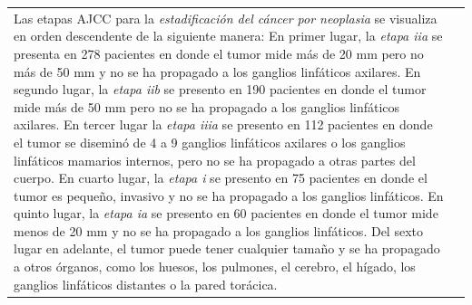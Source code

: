 \begin{table}[!htb]
	\footnotesize
	\begin{threeparttable}
		\begin{tabular}{p{8cm} p{7cm}} \toprule	 
			Las etapas AJCC para la \textit{estadificación del cáncer por neoplasia} se visualiza en orden descendente de la siguiente manera: En primer lugar, la \textit{etapa iia} se presenta en 278 pacientes en donde el tumor mide más de 20 mm pero no más de 50 mm y no se ha propagado a los ganglios linfáticos axilares. En segundo lugar, la \textit{etapa iib} se presento en 190 pacientes en donde el tumor mide más de 50 mm pero no se ha propagado a los ganglios linfáticos axilares. En tercer lugar la \textit{etapa iiia} se presento en 112 pacientes en donde el tumor se diseminó de 4 a 9 ganglios linfáticos axilares o los ganglios linfáticos mamarios internos, pero no se ha propagado a otras partes del cuerpo. En cuarto lugar, la \textit{etapa i} se presento en 75 pacientes  en donde el tumor es pequeño, invasivo y no se ha propagado a los ganglios linfáticos. En quinto lugar, la \textit{etapa ia} se presento en 60 pacientes en donde el tumor mide menos de 20 mm  y no se ha propagado a los ganglios linfáticos. Del sexto lugar en adelante, el tumor puede tener cualquier tamaño y se ha propagado a otros órganos, como los huesos, los pulmones, el cerebro, el hígado, los ganglios linfáticos distantes o la pared torácica.
			

\end{tabular}
\end{threeparttable}
\end{table}
